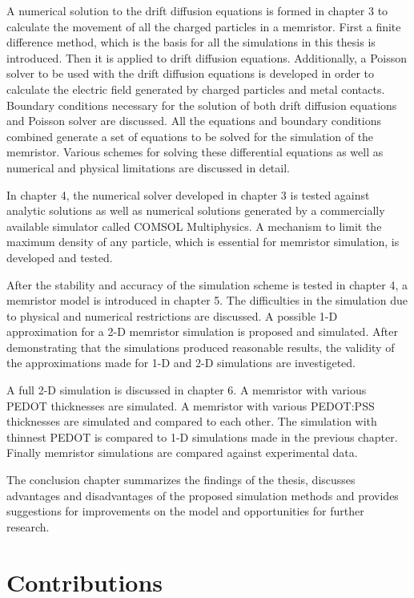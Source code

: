 \begin{doublespace}
A numerical solution to the drift diffusion equations is formed in chapter 3 to calculate the movement of all the charged particles in a memristor. First a finite difference method, which is the basis for all the simulations in this thesis is introduced. Then it is applied to drift diffusion equations. Additionally, a Poisson solver to be used with the drift diffusion equations is developed in order to calculate the electric field generated by charged particles and metal contacts. Boundary conditions necessary for the solution of both drift diffusion equations and Poisson solver are discussed. All the equations and boundary conditions combined generate a set of equations to be solved for the simulation of the memristor. Various schemes for solving these differential equations as well as numerical and physical limitations are discussed in detail.
 
In chapter 4, the numerical solver developed in chapter 3 is tested against analytic solutions as well as numerical solutions generated by a commercially available simulator called COMSOL Multiphysics. A mechanism to limit the maximum density of any particle, which is essential for memristor simulation, is developed and tested. 

After the stability and accuracy of the simulation scheme is tested in chapter 4, a memristor model is introduced in chapter 5. The difficulties in the simulation due to physical and numerical restrictions are discussed. A possible 1-D approximation for a 2-D memristor simulation is proposed and simulated. After demonstrating that the simulations produced reasonable results, the validity of the approximations made for 1-D and 2-D simulations are investigeted.  

A full 2-D simulation is discussed in chapter 6. A memristor with various PEDOT thicknesses are simulated. A memristor with various PEDOT:PSS thicknesses are simulated and compared to each other. The simulation with thinnest PEDOT is compared to 1-D simulations made in the previous chapter. Finally memristor simulations are compared against experimental data.

The conclusion chapter summarizes the findings of the thesis, discusses advantages and disadvantages of the proposed simulation methods and provides suggestions for improvements on the model and opportunities for further research.

\section{Contributions}


\end{doublespace}
